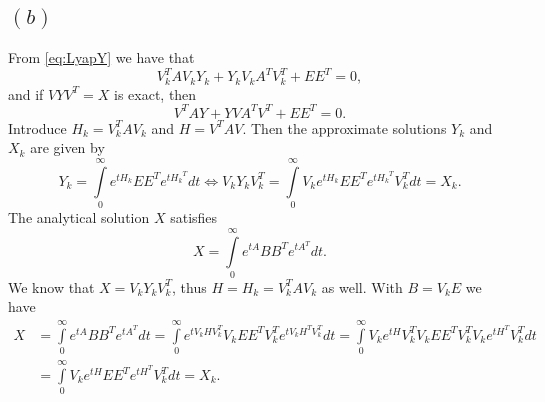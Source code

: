 \subsection*{$(b)$}
From \eqref{eq:LyapY} we have that
\begin{equation*}
V_{k}^{T}AV_{k}Y_{k}+Y_{k}V_{k}A^{T}V_{k}^{T} + EE^{T} = 0,
\end{equation*}
and if $VYV^{T} = X$ is exact, then
\begin{equation*}
V^{T}AY+YVA^{T}V^{T} + EE^{T} = 0.
\end{equation*}
Introduce $H_{k} = V_{k}^{T}AV_{k}$ and $H = V^{T}AV$. Then the approximate solutions $Y_{k}$ and
$X_{k}$ are given by
\begin{equation*}
Y_{k} =  \int\limits_{0}^{\infty}e^{tH_{k}}EE^{T}e^{{tH_{k}}^{T}}dt \Leftrightarrow V_{k}Y_{k}V_{k}^{T} =  \int\limits_{0}^{\infty}V_{k}e^{tH_{k}}EE^{T}e^{{tH_{k}}^{T}}V_{k}^{T}dt = X_{k}.
\end{equation*}
The analytical solution $X$ satisfies
\begin{equation*}
X =  \int\limits_{0}^{\infty}e^{tA}BB^{T}e^{{tA}^{T}}dt.
\end{equation*}
We know that $X = V_{k}Y_{k}V_{k}^{T}$, thus $H = H_{k} = V_{k}^{T}AV_{k}$ as well. With $B = V_{k}E$ we have
\begin{align*}
X &=  \int\limits_{0}^{\infty}e^{tA}BB^{T}e^{{tA}^{T}}dt =
\int\limits_{0}^{\infty}e^{tV_{k}HV_{k}^{T}}V_{k}EE^{T}V_{k}^{T}e^{tV_{k}H^{T}V_{k}^{T}}dt = \int\limits_{0}^{\infty}V_{k}e^{tH}V_{k}^{T}V_{k}EE^{T}V_{k}^{T}V_{k}e^{{tH}^{T}}V_{k}^{T}dt\\
&=\int\limits_{0}^{\infty}V_{k}e^{tH}EE^{T}e^{{tH}^{T}}V_{k}^{T}dt = X_{k}.
\end{align*}

